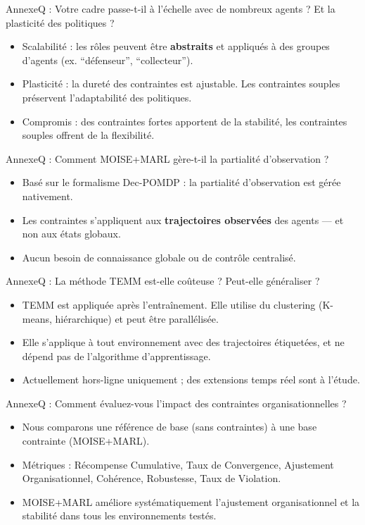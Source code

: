 \begin{frame}{Annexe}{Q : Votre cadre passe-t-il à l’échelle avec de nombreux agents ? Et la plasticité des politiques ?}
    \begin{itemize}
        \item Scalabilité : les rôles peuvent être \textbf{abstraits} et appliqués à des groupes d’agents (ex. “défenseur”, “collecteur”).
        \item Plasticité : la dureté des contraintes est ajustable. Les contraintes souples préservent l’adaptabilité des politiques.
        \item Compromis : des contraintes fortes apportent de la stabilité, les contraintes souples offrent de la flexibilité.
    \end{itemize}
\end{frame}

\begin{frame}{Annexe}{Q : Comment MOISE+MARL gère-t-il la partialité d’observation ?}
    \begin{itemize}
        \item Basé sur le formalisme Dec-POMDP : la partialité d’observation est gérée nativement.
        \item Les contraintes s’appliquent aux \textbf{trajectoires observées} des agents — et non aux états globaux.
        \item Aucun besoin de connaissance globale ou de contrôle centralisé.
    \end{itemize}
\end{frame}

\begin{frame}{Annexe}{Q : La méthode TEMM est-elle coûteuse ? Peut-elle généraliser ?}
    \begin{itemize}
        \item TEMM est appliquée après l'entraînement. Elle utilise du clustering (K-means, hiérarchique) et peut être parallélisée.
        \item Elle s’applique à tout environnement avec des trajectoires étiquetées, et ne dépend pas de l’algorithme d’apprentissage.
        \item Actuellement hors-ligne uniquement ; des extensions temps réel sont à l’étude.
    \end{itemize}
\end{frame}

\begin{frame}{Annexe}{Q : Comment évaluez-vous l’impact des contraintes organisationnelles ?}
    \begin{itemize}
        \item Nous comparons une référence de base (sans contraintes) à une base contrainte (MOISE+MARL).
        \item Métriques : Récompense Cumulative, Taux de Convergence, Ajustement Organisationnel, Cohérence, Robustesse, Taux de Violation.
        \item MOISE+MARL améliore systématiquement l’ajustement organisationnel et la stabilité dans tous les environnements testés.
    \end{itemize}
\end{frame}

